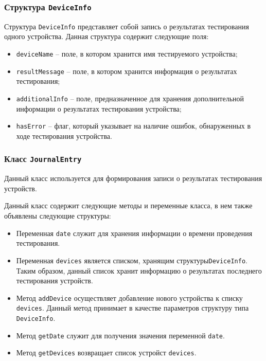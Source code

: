 \subsubsection{Структура \texttt{DeviceInfo}}
Структура \texttt{DeviceInfo} представляет собой запись о результатах тестирования одного устройства.
Данная структура содержит следующие поля:
\begin{itemize}
	\item \texttt{deviceName} -- поле, в котором хранится имя тестируемого устройства;
	\item \texttt{resultMessage} -- поле, в котором хранится информация о результатах тестирования;
	\item \texttt{additionalInfo} -- поле, предназначенное для хранения дополнительной информации о
		результатах тестирования устройства;
	\item \texttt{hasError} -- флаг, который указывает на наличие ошибок, обнаруженных в ходе
		тестирования устройства.
\end{itemize}

\subsubsection{Класс \texttt{JournalEntry}}
Данный класс используется для формирования записи о результатах тестирования устройств.

Данный класс содержит следующие методы и переменные класса, в нем также объявлены следующие структуры:
\begin{itemize}
	\item Переменная \texttt{date} служит для хранения информации о времени проведения тестирования.

	\item Переменная \texttt{devices} является списком, хранящим структуры\break \texttt{DeviceInfo}. Таким образом,
		данный список хранит информацию о результатах последнего тестирования устройств.

	\item Метод \texttt{addDevice} осуществляет добавление нового устройства к списку \texttt{devices}. Данный метод
		принимает в качестве параметров структуру типа \texttt{DeviceInfo}.

	\item Метод \texttt{getDate} служит для получения значения переменной \texttt{date}.

	\item Метод \texttt{getDevices} возвращает список устройст \texttt{devices}.
\end{itemize}

